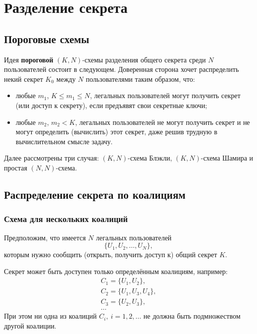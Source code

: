 \chapter{Разделение секрета}

\section{Пороговые схемы}

Идея \textbf{пороговой} $(K, N)$-схемы разделения общего секрета среди $N$ пользователей состоит в следующем. Доверенная сторона хочет распределить некий секрет $K_0$ между $N$ пользователями таким образом, что:
\begin{itemize}
    \item любые $m_1$, $K \le m_1 \le N$, легальных пользователей могут получить секрет (или доступ к секрету), если предъявят свои секретные ключи;
    \item любые $m_2$, $m_2 < K$, легальных пользователей не могут получить секрет и не могут определить (вычислить) этот секрет, даже решив трудную в вычислительном смысле задачу.
\end{itemize}

Далее рассмотрены три случая: $(K, N)$-схема Блэкли, $(K, N)$-схема Шамира и простая $(N,N)$-схема.







\section{Распределение секрета по коалициям}

\subsection{Схема для нескольких коалиций}

Предположим, что имеется $N$ легальных пользователей
    \[ \{ U_1, U_2, \dots, U_N \}, \]
которым нужно сообщить (открыть, получить доступ к) общий секрет $K$.

Секрет может быть доступен только определённым коалициям, например:
\[ \begin{array}{l}
    C_1 = \{ U_1, U_2 \}, \\
    C_2 = \{ U_1, U_3, U_4 \}, \\
    C_3 = \{ U_2, U_3 \}, \\
    \dots
\end{array} \]
При этом ни одна из коалиций $C_i, ~ i = 1, 2, \dots$ не должна быть подмножеством другой коалиции.



